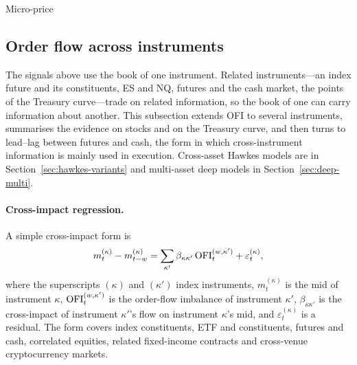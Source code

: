\begin{modelcard}{Micro-price}
\end{modelcard}

\subsection{Order flow across instruments}
\label{sec:cross}

The signals above use the book of one instrument. Related instruments---an index future and its constituents, ES
and NQ, futures and the cash market, the points of the Treasury curve---trade on related information, so the book of
one can carry information about another. This subsection extends OFI to several instruments, summarises the evidence
on stocks and on the Treasury curve, and then turns to lead--lag between futures and cash, the form in which
cross-instrument information is mainly used in execution. Cross-asset Hawkes models are in
Section~\ref{sec:hawkes-variants} and multi-asset deep models in Section~\ref{sec:deep-multi}.

\paragraph{Cross-impact regression.} A simple cross-impact form is
\begin{equation}
  m^{(\kappa)}_t - m^{(\kappa)}_{t-w} = \sum_{\kappa'} \beta_{\kappa \kappa'}\, \mathrm{OFI}^{(w,\kappa')}_t + \varepsilon^{(\kappa)}_t ,
\end{equation}
where the superscripts $(\kappa)$ and $(\kappa')$ index instruments, $m^{(\kappa)}_t$ is the mid of instrument $\kappa$,
$\mathrm{OFI}^{(w,\kappa')}_t$ is the order-flow imbalance of instrument $\kappa'$, $\beta_{\kappa \kappa'}$ is the cross-impact
of instrument $\kappa'$'s flow on instrument $\kappa$'s mid, and $\varepsilon^{(\kappa)}_t$ is a residual.
 The form covers
index constituents, ETF and constituents, futures and cash, correlated equities, related
fixed-income contracts and cross-venue cryptocurrency markets.

